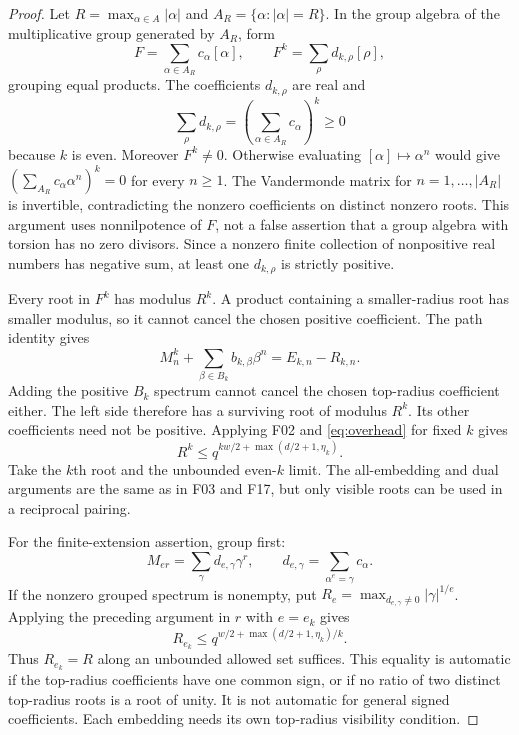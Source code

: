 \documentclass[11pt,a4paper]{article}
\newcommand{\fid}[1]{\textsf{#1}}\newcommand{\gate}[1]{\textsf{#1}}
\theoremstyle{named}\newtheorem{finding}{Finding}[section]
\theoremstyle{definition}\newtheorem{definition}[finding]{Definition}
\theoremstyle{remark}\newtheorem{remark}[finding]{Remark}
\begin{document}
\begin{proof}
Let $R=\max_{\alpha\in A}|\alpha|$ and
$A_R=\{\alpha:|\alpha|=R\}$. In the group algebra of the multiplicative group
generated by $A_R$, form
\[
 F=\sum_{\alpha\in A_R}c_\alpha[\alpha],\qquad
 F^k=\sum_\rho d_{k,\rho}[\rho],
\]
grouping equal products. The coefficients $d_{k,\rho}$ are real and
\[
 \sum_\rho d_{k,\rho}
   =\left(\sum_{\alpha\in A_R}c_\alpha\right)^k\ge0
\]
because $k$ is even. Moreover $F^k\ne0$. Otherwise evaluating
$[\alpha]\mapsto\alpha^n$ would give
$(\sum_{A_R}c_\alpha\alpha^n)^k=0$ for every $n\ge1$.
The Vandermonde matrix for $n=1,\ldots,|A_R|$ is invertible, contradicting
the nonzero coefficients on distinct nonzero roots. This argument uses
nonnilpotence of $F$, not a false assertion that a group algebra with
torsion has no zero divisors. Since a nonzero finite collection of
nonpositive real numbers has negative sum, at least one $d_{k,\rho}$ is
strictly positive.

Every root in $F^k$ has modulus $R^k$. A product containing a smaller-radius
root has smaller modulus, so it cannot cancel the chosen positive
coefficient. The path identity gives
\[
 M_n^k+\sum_{\beta\in B_k}b_{k,\beta}\beta^n=E_{k,n}-R_{k,n}.
\]
Adding the positive $B_k$ spectrum cannot cancel the chosen top-radius
coefficient either. The left side therefore has a surviving root of modulus
$R^k$. Its other coefficients need not be positive. Applying \fid{F02}
and \eqref{eq:overhead} for fixed $k$ gives
\[
 R^k\le q^{kw/2+\max(d/2+1,\eta_k)}.
\]
Take the $k$th root and the unbounded even-$k$ limit. The all-embedding and
dual arguments are the same as in \fid{F03} and \fid{F17}, but only visible
roots can be used in a reciprocal pairing.

For the finite-extension assertion, group first:
\[
 M_{er}=\sum_\gamma d_{e,\gamma}\gamma^r,
 \qquad d_{e,\gamma}=\sum_{\alpha^e=\gamma}c_\alpha.
\]
If the nonzero grouped spectrum is nonempty, put
$R_e=\max_{d_{e,\gamma}\ne0}|\gamma|^{1/e}$. Applying the preceding
argument in $r$ with $e=e_k$ gives
\[
 R_{e_k}\le q^{w/2+\max(d/2+1,\eta_k)/k}.
\]
Thus $R_{e_k}=R$ along an unbounded allowed set suffices. This equality is
automatic if the top-radius coefficients have one common sign, or if no
ratio of two distinct top-radius roots is a root of unity. It is not
automatic for general signed coefficients. Each embedding needs its own
top-radius visibility condition.
\end{proof}
\end{document}
